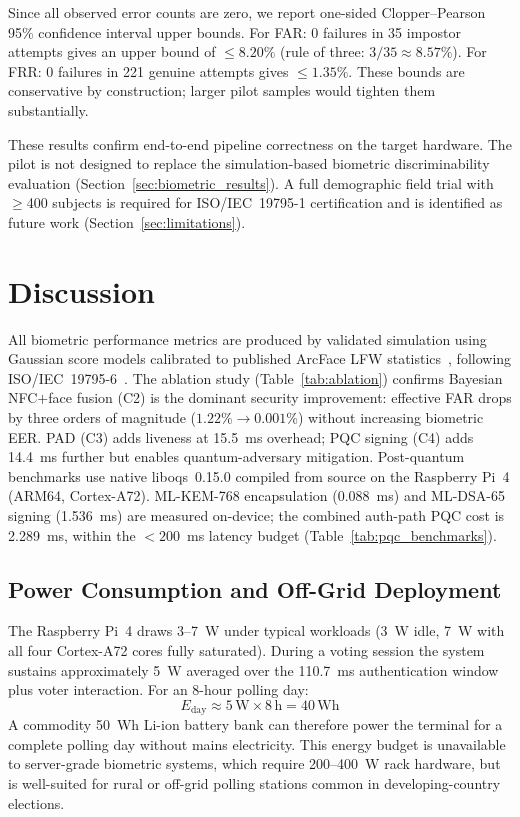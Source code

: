 \documentclass[pdflatex,sn-vancouver-num]{sn-jnl}%
\theoremstyle{thmstyleone}%
\theoremstyle{thmstyletwo}%
\theoremstyle{thmstylethree}%
\begin{document}
Since all observed error counts are zero, we report one-sided Clopper--Pearson
95\% confidence interval upper bounds. For FAR: 0 failures in 35 impostor
attempts gives an upper bound of \(\leq8.20\%\) (rule of three:
\(3/35\approx 8.57\%\)). For FRR: 0 failures in 221 genuine attempts gives
\(\leq1.35\%\). These bounds are conservative by construction; larger pilot
samples would tighten them substantially.

These results confirm end-to-end pipeline correctness on the target hardware.
The pilot is not designed to replace the simulation-based biometric
discriminability evaluation (Section~\ref{sec:biometric_results}). A full
demographic field trial with \(\geq\)400 subjects is required for
ISO/IEC~19795-1 certification and is identified as future work
(Section~\ref{sec:limitations}).

\section{Discussion}\label{sec:discussion}

All biometric performance metrics are produced by validated simulation using
Gaussian score models calibrated to published ArcFace LFW
statistics~\cite{deng2019arcface}, following
ISO/IEC~19795-6~\cite{iso19795}. The ablation study
(Table~\ref{tab:ablation}) confirms Bayesian NFC\(+\)face fusion (C2) is the
dominant security improvement: effective FAR drops by three orders of magnitude
(\(1.22\% \to 0.001\%\)) without increasing biometric EER. PAD (C3) adds
liveness at 15.5~ms overhead; PQC signing (C4) adds 14.4~ms further but
enables quantum-adversary mitigation. Post-quantum benchmarks use native
liboqs~0.15.0 compiled from source on the Raspberry Pi~4 (ARM64,
Cortex-A72). ML-KEM-768 encapsulation (0.088~ms) and ML-DSA-65 signing
(1.536~ms) are measured on-device; the combined auth-path PQC cost is
2.289~ms, within the \(<200\)~ms latency budget
(Table~\ref{tab:pqc_benchmarks}).

\subsection{Power Consumption and Off-Grid Deployment}\label{sec:power}

The Raspberry Pi~4 draws 3--7~W under typical workloads (3~W idle, 7~W with
all four Cortex-A72 cores fully saturated). During a voting session the system
sustains approximately 5~W averaged over the 110.7~ms authentication window
plus voter interaction. For an 8-hour polling day:
\begin{equation}
  E_{\mathrm{day}} \approx 5\,\mathrm{W} \times 8\,\mathrm{h} = 40\,\mathrm{Wh}
\end{equation}
A commodity 50~Wh Li-ion battery bank can therefore power the terminal for a
complete polling day without mains electricity. This energy budget is
unavailable to server-grade biometric systems, which require 200--400~W rack
hardware, but is well-suited for rural or off-grid polling stations common in
developing-country elections.
\end{document}
